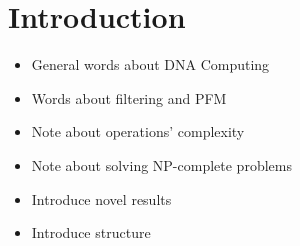 \section{Introduction}
\begin{itemize}
	\item General words about DNA Computing \cite{Amos:2002, Adleman, Lipton, PaunRozenbergSalomaa}
	\item Words about filtering and PFM \cite{Amos:1996}
	\item Note about operations' complexity \cite{Amos:1997}
	\item Note about solving NP-complete problems
	\item Introduce novel results
	\item Introduce structure
\end{itemize}


